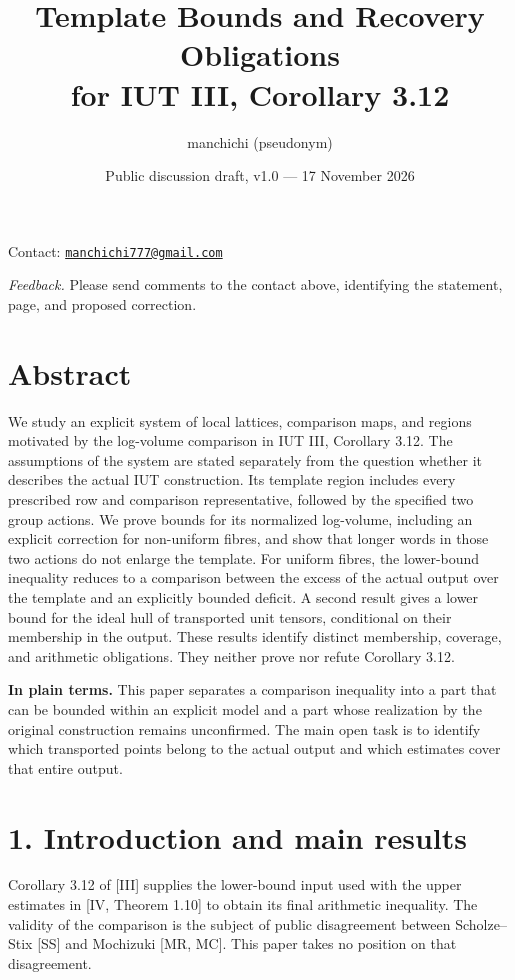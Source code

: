 \documentclass[11pt,a4paper]{amsart}
\title[Template bounds and recovery obligations]{Template Bounds and Recovery Obligations\\for IUT III, Corollary 3.12}
\author[manchichi]{manchichi (pseudonym)}
\date{Public discussion draft, v1.0 --- 17 November 2026}
\begin{document}
\maketitle
\setlength{\abovedisplayskip}{7pt plus 2pt minus 2pt}
\setlength{\belowdisplayskip}{7pt plus 2pt minus 2pt}
\setlength{\abovedisplayshortskip}{4pt plus 2pt}
\setlength{\belowdisplayshortskip}{5pt plus 2pt minus 2pt}
\begin{center}\small
Contact: \href{mailto:manchichi777@gmail.com}{\nolinkurl{manchichi777@gmail.com}}
\end{center}
\noindent\textit{Feedback.} Please send comments to the contact above, identifying the statement, page, and proposed correction.
\section*{Abstract}

We study an explicit system of local lattices, comparison maps, and regions motivated by the log-volume comparison in IUT III, Corollary 3.12. The assumptions of the system are stated separately from the question whether it describes the actual IUT construction. Its template region includes every prescribed row and comparison representative, followed by the specified two group actions. We prove bounds for its normalized log-volume, including an explicit correction for non-uniform fibres, and show that longer words in those two actions do not enlarge the template. For uniform fibres, the lower-bound inequality reduces to a comparison between the excess of the actual output over the template and an explicitly bounded deficit. A second result gives a lower bound for the ideal hull of transported unit tensors, conditional on their membership in the output. These results identify distinct membership, coverage, and arithmetic obligations. They neither prove nor refute Corollary 3.12.


\textbf{In plain terms.} This paper separates a comparison inequality into a part that can be bounded within an explicit model and a part whose realization by the original construction remains unconfirmed. The main open task is to identify which transported points belong to the actual output and which estimates cover that entire output.


\section*{1. Introduction and main results}

Corollary 3.12 of [III] supplies the lower-bound input used with the upper estimates in [IV, Theorem 1.10] to obtain its final arithmetic inequality. The validity of the comparison is the subject of public disagreement between Scholze--Stix [SS] and Mochizuki [MR, MC]. This paper takes no position on that disagreement.
\end{document}
